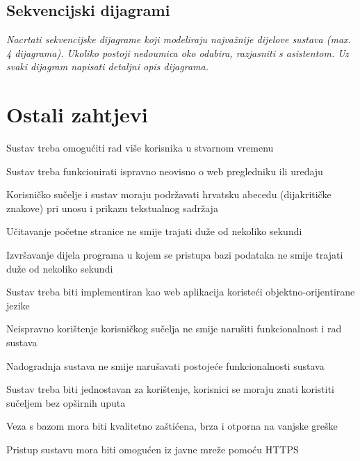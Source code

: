 			\subsection{Sekvencijski dijagrami}
				
				\textit{Nacrtati sekvencijske dijagrame koji modeliraju najvažnije dijelove sustava (max. 4 dijagrama). Ukoliko postoji nedoumica oko odabira, razjasniti s asistentom. Uz svaki dijagram napisati detaljni opis dijagrama.}
				\eject
	
		\section{Ostali zahtjevi}
		 
			 \begin{packed_item}
			 
			 \item Sustav treba omogućiti rad više korisnika u stvarnom vremenu
			 \item Sustav treba funkcionirati ispravno neovisno o web pregledniku ili uređaju
			 \item Korisničko sučelje i sustav moraju podržavati hrvatsku abecedu (dijakritičke znakove) pri unosu i prikazu tekstualnog sadržaja
			 \item Učitavanje početne stranice ne smije trajati duže od nekoliko sekundi
			 \item Izvršavanje dijela programa u kojem se pristupa bazi podataka ne smije trajati duže od nekoliko sekundi
			 \item Sustav treba biti implementiran kao web aplikacija koristeći objektno-orijentirane jezike
			 \item Neispravno korištenje korisničkog sučelja ne smije narušiti funkcionalnost i rad sustava
			 \item Nadogradnja sustava ne smije narušavati postojeće funkcionalnosti sustava
			 \item Sustav treba biti jednostavan za korištenje, korisnici se moraju znati koristiti sučeljem bez opširnih uputa
			 \item Veza s bazom mora biti kvalitetno zaštićena, brza i otporna na vanjske greške
			 \item Pristup sustavu mora biti omogućen iz javne mreže pomoću HTTPS
			 
			 
			 \end{packed_item}
			 
			 
			 
	